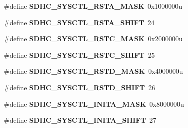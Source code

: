 \begin{DoxyCompactItemize}
\item 
\#define {\bfseries S\+D\+H\+C\+\_\+\+S\+Y\+S\+C\+T\+L\+\_\+\+R\+S\+T\+A\+\_\+\+M\+A\+SK}~0x1000000u\hypertarget{group__SDHC__Register__Masks_gab4c8c72837143c46d7c36342c494b4ad}{}\label{group__SDHC__Register__Masks_gab4c8c72837143c46d7c36342c494b4ad}

\item 
\#define {\bfseries S\+D\+H\+C\+\_\+\+S\+Y\+S\+C\+T\+L\+\_\+\+R\+S\+T\+A\+\_\+\+S\+H\+I\+FT}~24\hypertarget{group__SDHC__Register__Masks_gaa5f5e5f66dea7902c53a8cb01ec27fbb}{}\label{group__SDHC__Register__Masks_gaa5f5e5f66dea7902c53a8cb01ec27fbb}

\item 
\#define {\bfseries S\+D\+H\+C\+\_\+\+S\+Y\+S\+C\+T\+L\+\_\+\+R\+S\+T\+C\+\_\+\+M\+A\+SK}~0x2000000u\hypertarget{group__SDHC__Register__Masks_ga10f1184a683dcb78737e3620660d6b62}{}\label{group__SDHC__Register__Masks_ga10f1184a683dcb78737e3620660d6b62}

\item 
\#define {\bfseries S\+D\+H\+C\+\_\+\+S\+Y\+S\+C\+T\+L\+\_\+\+R\+S\+T\+C\+\_\+\+S\+H\+I\+FT}~25\hypertarget{group__SDHC__Register__Masks_ga3d422fd7f88100a1e5ec873d8d670792}{}\label{group__SDHC__Register__Masks_ga3d422fd7f88100a1e5ec873d8d670792}

\item 
\#define {\bfseries S\+D\+H\+C\+\_\+\+S\+Y\+S\+C\+T\+L\+\_\+\+R\+S\+T\+D\+\_\+\+M\+A\+SK}~0x4000000u\hypertarget{group__SDHC__Register__Masks_ga920797e969967edc2e737c8db7ce92aa}{}\label{group__SDHC__Register__Masks_ga920797e969967edc2e737c8db7ce92aa}

\item 
\#define {\bfseries S\+D\+H\+C\+\_\+\+S\+Y\+S\+C\+T\+L\+\_\+\+R\+S\+T\+D\+\_\+\+S\+H\+I\+FT}~26\hypertarget{group__SDHC__Register__Masks_ga1997ff19d3faec07899352f7ca6c0ad8}{}\label{group__SDHC__Register__Masks_ga1997ff19d3faec07899352f7ca6c0ad8}

\item 
\#define {\bfseries S\+D\+H\+C\+\_\+\+S\+Y\+S\+C\+T\+L\+\_\+\+I\+N\+I\+T\+A\+\_\+\+M\+A\+SK}~0x8000000u\hypertarget{group__SDHC__Register__Masks_ga2a115ba3d13885e273f8113ee502beb3}{}\label{group__SDHC__Register__Masks_ga2a115ba3d13885e273f8113ee502beb3}

\item 
\#define {\bfseries S\+D\+H\+C\+\_\+\+S\+Y\+S\+C\+T\+L\+\_\+\+I\+N\+I\+T\+A\+\_\+\+S\+H\+I\+FT}~27\hypertarget{group__SDHC__Register__Masks_ga2567891a05c79b0dc5fe49160972a448}{}\label{group__SDHC__Register__Masks_ga2567891a05c79b0dc5fe49160972a448}


\end{DoxyCompactItemize}
